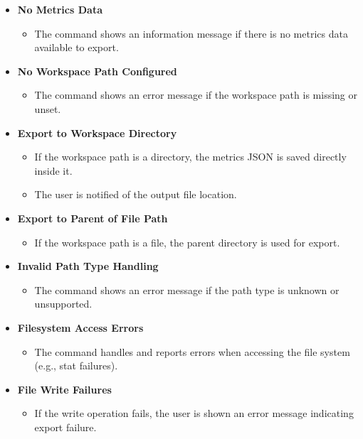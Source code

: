 \documentclass[12pt, titlepage]{article}
\begin{document}
\begin{itemize}
  \item \textbf{No Metrics Data}
    \begin{itemize}
      \item The command shows an information message if there is no metrics data available to export.
    \end{itemize}

  \item \textbf{No Workspace Path Configured}
    \begin{itemize}
      \item The command shows an error message if the workspace path is missing or unset.
    \end{itemize}

  \item \textbf{Export to Workspace Directory}
    \begin{itemize}
      \item If the workspace path is a directory, the metrics JSON is saved directly inside it.
      \item The user is notified of the output file location.
    \end{itemize}

  \item \textbf{Export to Parent of File Path}
    \begin{itemize}
      \item If the workspace path is a file, the parent directory is used for export.
    \end{itemize}

  \item \textbf{Invalid Path Type Handling}
    \begin{itemize}
      \item The command shows an error message if the path type is unknown or unsupported.
    \end{itemize}

  \item \textbf{Filesystem Access Errors}
    \begin{itemize}
      \item The command handles and reports errors when accessing the file system (e.g., stat failures).
    \end{itemize}

  \item \textbf{File Write Failures}
    \begin{itemize}
      \item If the write operation fails, the user is shown an error message indicating export failure.
    \end{itemize}
\end{itemize}
\end{document}
